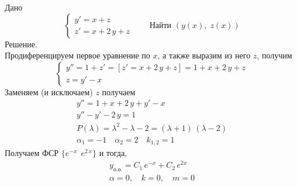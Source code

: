 \begin{Example}
    Дано
    \[
        \begin{cases}
            y' = x + z\\
            z' = x + 2\,y + z
        \end{cases} \qquad \text{Найти } (y(x),\; z(x))
    \]
    Решение.\\
    Продиференцируем первое уравнение по $x$, а также выразим из него $z$, получим
    \[
        \begin{cases}
            y'' = 1 + z' = [z' = x + 2\,y + z] = 1 + x + 2\,y + z\\
            z = y' - x
        \end{cases}
    \]
    Заменяем (и исключаем) $z$ получаем
    \begin{gather*}
        y'' = 1 + x + 2\,y + y' - x\\
        y'' - y' - 2\,y = 1\\
        P(\lambda) = \lambda^2 - \lambda - 2 = (\lambda + 1)\,(\lambda - 2)\\
        \alpha_1 = -1 \quad \alpha_2 = 2 \quad k_{1, 2} = 1
    \end{gather*}
    Получаем ФСР $\{e^{-x}\,\; e^{2\,x}\}$ и тогда,
    \begin{gather*}
        y_{\text{о.о.}} = C_1\,e^{-x} + C_2\,e^{2x}\\
        \alpha = 0,\quad k = 0,\quad m=0
    \end{gather*}  
\end{Example}